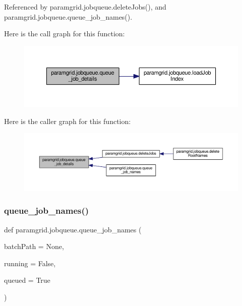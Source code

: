 Referenced by paramgrid.\+jobqueue.\+delete\+Jobs(), and paramgrid.\+jobqueue.\+queue\+\_\+job\+\_\+names().

Here is the call graph for this function\+:
\nopagebreak
\begin{figure}[H]
\begin{center}
\leavevmode
\includegraphics[width=350pt]{namespaceparamgrid_1_1jobqueue_af4426f4a1bf4d4051e4c05f6627e9fef_cgraph}
\end{center}
\end{figure}
Here is the caller graph for this function\+:
\nopagebreak
\begin{figure}[H]
\begin{center}
\leavevmode
\includegraphics[width=350pt]{namespaceparamgrid_1_1jobqueue_af4426f4a1bf4d4051e4c05f6627e9fef_icgraph}
\end{center}
\end{figure}
\mbox{\label{namespaceparamgrid_1_1jobqueue_a6fab141ec4e778b457d8e3c3f0447037}} 
\subsubsection{\texorpdfstring{queue\+\_\+job\+\_\+names()}{queue\_job\_names()}}
{\footnotesize\ttfamily def paramgrid.\+jobqueue.\+queue\+\_\+job\+\_\+names (\begin{DoxyParamCaption}\item[{}]{batch\+Path = {\ttfamily None},  }\item[{}]{running = {\ttfamily False},  }\item[{}]{queued = {\ttfamily True} }\end{DoxyParamCaption})}



